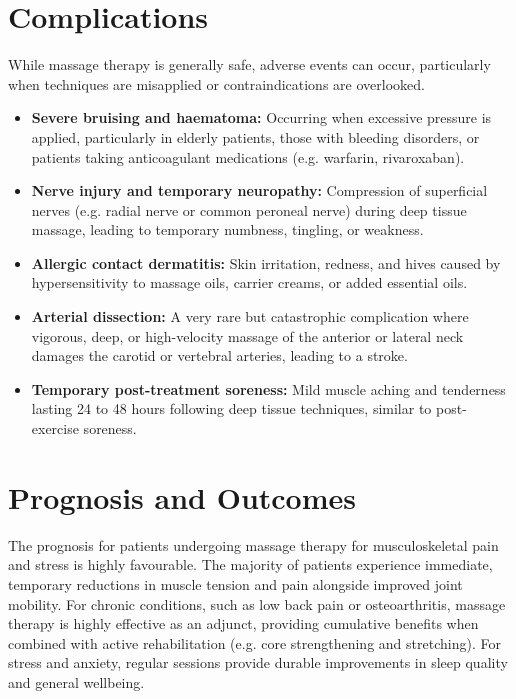 \section*{Complications}
While massage therapy is generally safe, adverse events can occur, particularly when techniques are misapplied or contraindications are overlooked.
\begin{itemize}
    \item \textbf{Severe bruising and haematoma:} Occurring when excessive pressure is applied, particularly in elderly patients, those with bleeding disorders, or patients taking anticoagulant medications (e.g. warfarin, rivaroxaban).
    \item \textbf{Nerve injury and temporary neuropathy:} Compression of superficial nerves (e.g. radial nerve or common peroneal nerve) during deep tissue massage, leading to temporary numbness, tingling, or weakness.
    \item \textbf{Allergic contact dermatitis:} Skin irritation, redness, and hives caused by hypersensitivity to massage oils, carrier creams, or added essential oils.
    \item \textbf{Arterial dissection:} A very rare but catastrophic complication where vigorous, deep, or high-velocity massage of the anterior or lateral neck damages the carotid or vertebral arteries, leading to a stroke.
    \item \textbf{Temporary post-treatment soreness:} Mild muscle aching and tenderness lasting 24 to 48 hours following deep tissue techniques, similar to post-exercise soreness.
\end{itemize}

\section*{Prognosis and Outcomes}
The prognosis for patients undergoing massage therapy for musculoskeletal pain and stress is highly favourable. The majority of patients experience immediate, temporary reductions in muscle tension and pain alongside improved joint mobility. For chronic conditions, such as low back pain or osteoarthritis, massage therapy is highly effective as an adjunct, providing cumulative benefits when combined with active rehabilitation (e.g. core strengthening and stretching). For stress and anxiety, regular sessions provide durable improvements in sleep quality and general wellbeing.

